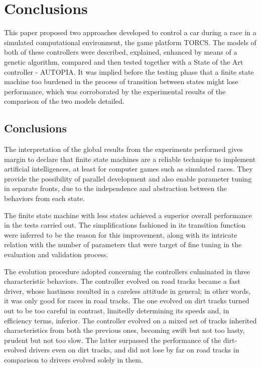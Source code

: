 \section{Conclusions} \label{sec:Conclusions}

	This paper proposed two approaches developed to control a car during a race in a simulated computational environment, the game platform TORCS. The models of both of these controllers were described, explained, enhanced by means of a genetic algorithm, compared and then tested together with a State of the Art controller - AUTOPIA. It was implied before the testing phase that a finite state machine too burdened in the process of transition between states might lose performance, which was corroborated by the experimental results of the comparison of the two models detailed.
		
\subsection{Conclusions} \label{subsec:Conclusions}

	The interpretation of the global results from the experiments performed gives margin to declare that finite state machines are a reliable technique to implement artificial intelligences, at least for computer games such as simulated races. They provide the possibility of parallel development and also enable parameter tuning in separate fronts, due to the independence and abstraction between the behaviors from each state.

	The finite state machine with less states achieved a superior overall performance in the tests carried out. The simplifications fashioned in its transition function were inferred to be the reason for this improvement, along with its intricate relation with the number of parameters that were target of fine tuning in the evaluation and validation process.
	
	The evolution procedure adopted concerning the controllers culminated in three characteristic behaviors. The controller evolved on road tracks became a fast driver, whose hastiness resulted in a careless attitude in general; in other words, it was only good for races in road tracks. The one evolved on dirt tracks turned out to be too careful in contrast, limitedly determining its speeds and, in efficiency terms, inferior. The controller evolved on a mixed set of tracks inherited characteristics from both the previous ones, becoming swift but not too hasty, prudent but not too slow. The latter surpassed the performance of the dirt-evolved drivers even on dirt tracks, and did not lose by far on road tracks in comparison to drivers evolved solely in them.

